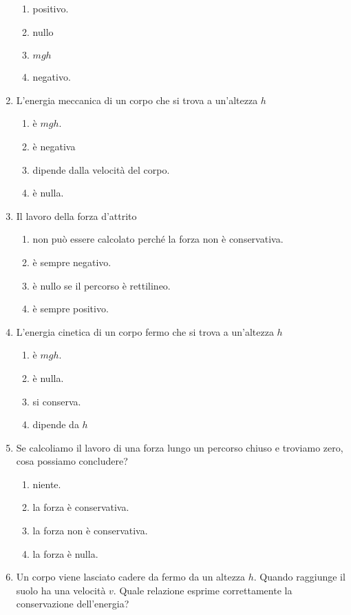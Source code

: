 \documentclass{article}
\begin{document}
\begin{enumerate}
\begin{enumerate}[label=\Alph*.]
    \item positivo.
    \item nullo
    \item $mgh$
    \item negativo.
  \end{enumerate}
  \item L'energia meccanica di un corpo che si trova a un'altezza $h$
  \begin{enumerate}[label=\Alph*.]
    \item è $mgh$.
    \item è negativa
    \item dipende dalla velocità del corpo.
    \item è nulla.
  \end{enumerate}
  \item Il lavoro della forza d'attrito
  \begin{enumerate}[label=\Alph*.]
    \item non può essere calcolato perché la forza non è conservativa.
    \item è sempre negativo.
    \item è nullo se il percorso è rettilineo.
    \item è sempre positivo.
  \end{enumerate}
  \item L'energia cinetica di un corpo fermo che si trova a un'altezza $h$
  \begin{enumerate}[label=\Alph*.]
    \item è $mgh$.
    \item è nulla.
    \item si conserva.
    \item dipende da $h$
  \end{enumerate}
  \item Se calcoliamo il lavoro di una forza lungo un percorso chiuso e troviamo zero, cosa possiamo concludere?
  \begin{enumerate}[label=\Alph*.]
    \item niente.
    \item la forza è conservativa.
    \item la forza non è conservativa.
    \item la forza è nulla.
  \end{enumerate}
  \item Un corpo viene lasciato cadere da fermo da un altezza $h$. Quando raggiunge il suolo ha una velocità $v$. Quale relazione esprime correttamente la conservazione dell'energia?

\end{enumerate}
\end{document}
